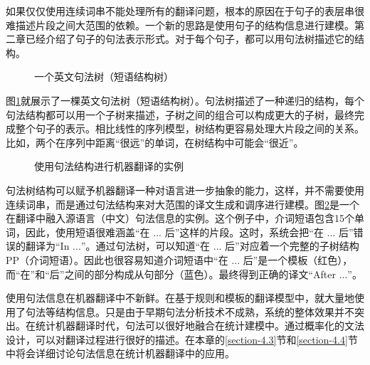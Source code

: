 \parinterval 如果仅仅使用连续词串不能处理所有的翻译问题，根本的原因在于句子的表层串很难描述片段之间大范围的依赖。一个新的思路是使用句子的结构信息进行建模。第二章已经介绍了句子的句法表示形式。对于每个句子，都可以用句法树描述它的结构。

\begin{figure}[htp]
\centering

\caption{一个英文句法树（短语结构树）}
\label{fig:4-7}
\end{figure}

\parinterval 图\ref{fig:4-7}就展示了一棵英文句法树（短语结构树）。句法树描述了一种递归的结构，每个句法结构都可以用一个子树来描述，子树之间的组合可以构成更大的子树，最终完成整个句子的表示。相比线性的序列模型，树结构更容易处理大片段之间的关系。比如，两个在序列中距离``很远''的单词，在树结构中可能会``很近''。

\begin{figure}[htp]
\centering

\caption{使用句法结构进行机器翻译的实例}
\label{fig:4-8}
\end{figure}

\parinterval 句法树结构可以赋予机器翻译一种对语言进一步抽象的能力，这样，并不需要使用连续词串，而是通过句法结构来对大范围的译文生成和调序进行建模。图\ref{fig:4-8}是一个在翻译中融入源语言（中文）句法信息的实例。这个例子中，介词短语包含15个单词，因此，使用短语很难涵盖``在 $...$ 后''这样的片段。这时，系统会把``在 $...$ 后''错误的翻译为``In $...$''。通过句法树，可以知道``在 $...$ 后''对应着一个完整的子树结构PP（介词短语）。因此也很容易知道介词短语中``在 $...$ 后''是一个模板（红色），而``在''和``后''之间的部分构成从句部分（蓝色）。最终得到正确的译文``After $...$''。

\parinterval 使用句法信息在机器翻译中不新鲜。在基于规则和模板的翻译模型中，就大量地使用了句法等结构信息。只是由于早期句法分析技术不成熟，系统的整体效果并不突出。在统计机器翻译时代，句法可以很好地融合在统计建模中。通过概率化的文法设计，可以对翻译过程进行很好的描述。在本章的\ref{section-4.3}节和\ref{section-4.4}节中将会详细讨论句法信息在统计机器翻译中的应用。


